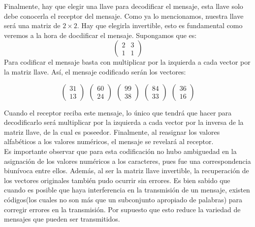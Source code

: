 \documentclass[12pt,a4paper]{article}
\begin{document}
Finalmente, hay que elegir una llave para decodificar el mensaje, esta llave solo debe conocerla el receptor del mensaje. Como ya lo mencionamos, nuestra llave ser\'a una matriz de $2\times 2$. Hay que elegirla invertible, esto es fundamental como veremos a la hora de docdificar el mensaje. Supongamos que es:
$$\left(\begin{array}{cc}2&3\\1&1\end{array}\right)$$
\newpage
Para codificar el mensaje basta con multiplicar por la izquierda a cada vector por la matriz llave. As\'i, el mensaje codificado ser\'an los vectores:

$$\left(\begin{array}{c}31\\13\end{array}\right)~~\left(\begin{array}{c}60\\24\end{array}\right)~~\left(\begin{array}{c}99\\38\end{array}\right)~~\left(\begin{array}{c}84\\33\end{array}\right)~~\left(\begin{array}{c}36\\16\end{array}\right)$$ 


Cuando el receptor reciba este mensaje, lo \'unico que tendr\'a que hacer para decodificarlo ser\'a multiplicar por la izquierda a cada vector por la inversa de la matriz llave, de la cual es poseedor. Finalmente, al reasignar los valores alfab\'eticos a los valores num\'ericos, el mensaje se revelar\'a al receptor.\\

Es importante observar que para esta codificaci\'on no hubo ambiguedad en la asignaci\'on de los valores num\'ericos a los caracteres, pues fue una correspondencia biun\'ivoca entre ellos. Adem\'as, al ser la matriz llave invertible, la recuperaci\'on de los vectores originales tambi\'en pudo ocurrir sin errores. Es bien sabido que cuando es posible que haya interferencia en la transmisi\'on de un mensaje, existen c\'odigos(los cuales no son m\'as que un subconjunto apropiado de palabras) para corregir errores en la transmisi\'on. Por supuesto que esto reduce la variedad de mensajes que pueden ser transmitidos.\\
\end{document}
